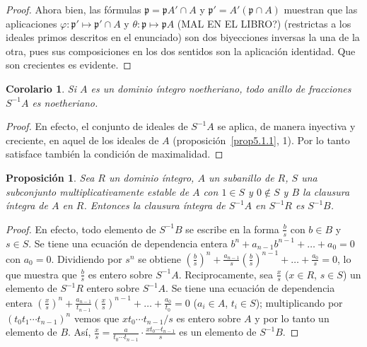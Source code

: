 \documentclass[10pt,oneside,bibtotoc,smallheadings,leqno,a5paper,DIV=12]{scrbook}
\newcommand{\idl}[1]{\mathfrak{#1}}
\newcommand{\QED}{}%
\numberwithin{equation}{section}
\theoremstyle{defi}
\theoremstyle{enonce}
\newtheorem{proposition}{Proposici\'on}
\newtheorem*{corollary*}{Corolario}
\theoremstyle{rem}
\numberwithin{theorem}{section}
\numberwithin{proposition}{section}
\numberwithin{definition}{section}
\numberwithin{lemma}{section}
\numberwithin{corollary}{section}
\numberwithin{example}{section}
\numberwithin{footnote}{section}%
\begin{document}
\begin{proof}
Ahora bien, las f\'ormulas $\idl{p} = \idl{p}A'\cap A$ y $\idl{p}' = A'(\idl{p}\cap A)$ muestran que
las aplicaciones $\varphi:\idl{p}'\mapsto\idl{p}'\cap A$ y $\theta : \idl{p}\mapsto\idl{p}A$ (MAL EN EL LIBRO?)
(restrictas a los ideales primos descritos en el enunciado) son dos biyecciones inversas la una de la otra, pues sus
composiciones en los dos sentidos son la aplicaci\'on identidad. Que son crecientes es evidente. \QED
\end{proof}

\begin{corollary*}
Si $A$ es un dominio \'integro noetheriano, todo anillo de fracciones $S^{-1}A$ es noetheriano.
\end{corollary*}

\begin{proof}
En efecto, el conjunto de ideales de $S^{-1}A$ se aplica, de manera inyectiva y creciente, en aquel de los
ideales de $A$ (proposici\'on~\ref{prop5.1.1}, 1).
Por lo tanto satisface tambi\'en la condici\'on de maximalidad.
\end{proof}

\begin{proposition}\label{prop5.1.2}
Sea $R$ un dominio \'integro, $A$ un subanillo de $R$, $S$ una subconjunto multiplicativamente estable de $A$ con
$1\in S$ y $0\notin S$ y $B$ la clausura \'integra de $A$ en $R$. Entonces la clausura \'integra de $S^{-1}A$ en
$S^{-1}R$ es $S^{-1}B$.
\end{proposition}

\begin{proof}
En efecto, todo elemento de $S^{-1}B$ se escribe en la forma $\frac{b}{s}$ con $b\in B$ y
$s\in S$. Se tiene una ecuaci\'on de dependencia entera $b^{n}+a_{n-1}b^{n-1}+\dots+a_{0}=0$ con
$a_{0}=0$. Dividiendo por $s^{n}$ se obtiene $\left(\frac{b}{s}\right)^{n}+\frac{a_{n-1}}{s}\left(\frac{b}{s}\right)^{n-1}
+\dots+\frac{a_{0}}{s}=0$, lo que muestra que $\frac{b}{s}$ es entero sobre $S^{-1}A$. Reciprocamente, sea
$\frac{x}{s}$ ($x\in R$, $s\in S$) un elemento de $S^{-1}R$ entero sobre $S^{-1}A$. Se tiene una ecuaci\'on de
dependencia entera $\left(\frac{x}{s}\right)^{n}+\frac{a_{n-1}}{t_{n-1}}\left(\frac{x}{s}\right)^{n-1}+
\dots+\frac{a_{0}}{t_{0}}=0$ ($a_{i}\in A$, $t_{i}\in S$); multiplicando por $(t_{0}t_{1}\cdots t_{n-1})^{n}$
vemos que $xt_{0}\cdots t_{n-1}/s$ es entero sobre $A$ y por lo tanto un elemento de $B$. As\'i,
$\frac{x}{s} = \frac{a}{t_{0}\cdots t_{n-1}}\cdot\frac{xt_{0}\cdots t_{n-1}}{s}$ es un elemento de $S^{-1}B$.
\end{proof}
\end{document}
